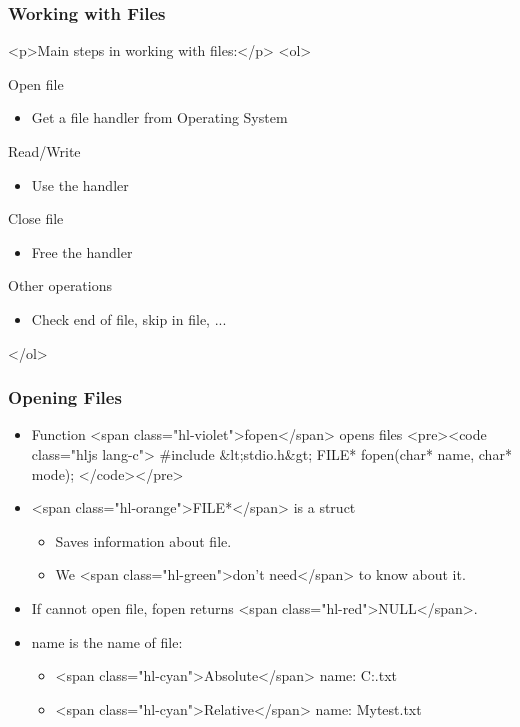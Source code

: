\documentclass{../c-lecture}
\begin{document}
\begin{frame}
  \frametitle{Working with Files}
  <p>Main steps in working with files:</p>
  <ol>
    \item Open file
    \begin{itemize}
      \item Get a file handler from Operating System
    \end{itemize}
    \item Read/Write
    \begin{itemize}
      \item Use the handler
    \end{itemize}
    \item Close file
    \begin{itemize}
      \item Free the handler
    \end{itemize}
    \item Other operations
    \begin{itemize}
      \item Check end of file, skip in file, ...
    \end{itemize}
  </ol>
\end{frame}
\begin{frame}
  \frametitle{Opening Files}
  \begin{itemize}
    \item Function <span class="hl-violet">fopen</span> opens files
    <pre><code class="hljs lang-c">
#include &lt;stdio.h&gt;
FILE* fopen(char* name, char* mode);
    </code></pre>
    \item <span class="hl-orange">FILE*</span> is a struct
    \begin{itemize}
      \item Saves information about file.
      \item We <span class="hl-green">don’t need</span> to know about it.
    \end{itemize}
    \item
      If cannot open file, fopen returns <span class="hl-red">NULL</span>.

    \item name is the name of file:
    \begin{itemize}
      \item <span class="hl-cyan">Absolute</span> name: C:\prog\test.txt
      \item <span class="hl-cyan">Relative</span> name: Mytest.txt
    \end{itemize}
  \end{itemize}
\end{frame}
\end{document}
